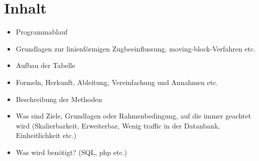 \section{Inhalt}


\begin{itemize}
\item Programmablauf
\item Grundlagen zur linienförmigen Zugbeeinflussung, moving-block-Verfahren etc.
\item Aufbau der Tabelle
\item Formeln, Herkunft, Ableitung, Vereinfachung und Annahmen etc.
\item Beschreibung der Methoden
\item Was sind Ziele, Grundlagen oder Rahmenbedingung, auf die immer geachtet wird (Skalierbarkeit, Erweiterbar, Wenig \glqq traffic\grqq{} in der Datanbank, Einheitlichkeit etc.)
\item Was wird benötigt? (SQL, php etc.)
\end{itemize}